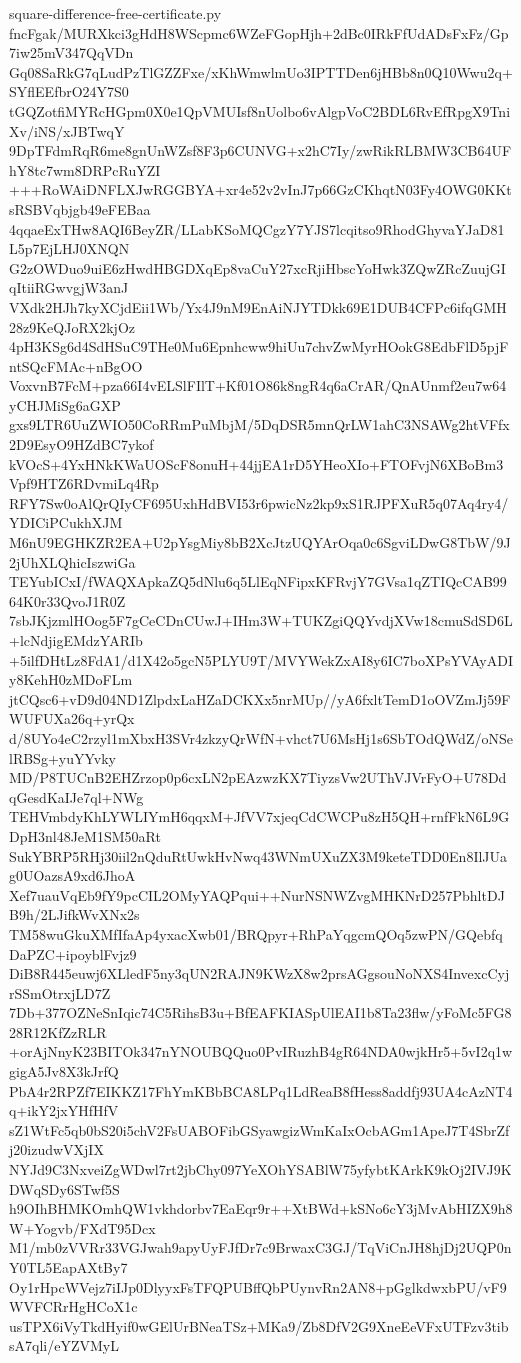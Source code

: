 \documentclass[11pt]{article}
\theoremstyle{definition}
\theoremstyle{remark}
\begin{document}
\begin{filecontents*}[overwrite]{square-difference-free-certificate.py}
fncFgak/MURXkci3gHdH8WScpmc6WZeFGopHjh+2dBc0IRkFfUdADsFxFz/Gp7iw25mV347QqVDn
Gq08SaRkG7qLudPzTlGZZFxe/xKhWmwlmUo3IPTTDen6jHBb8n0Q10Wwu2q+SYflEEfbrO24Y7S0
tGQZotfiMYRcHGpm0X0e1QpVMUIsf8nUolbo6vAlgpVoC2BDL6RvEfRpgX9TniXv/iNS/xJBTwqY
9DpTFdmRqR6me8gnUnWZsf8F3p6CUNVG+x2hC7Iy/zwRikRLBMW3CB64UFhY8tc7wm8DRPcRuYZI
+++RoWAiDNFLXJwRGGBYA+xr4e52v2vInJ7p66GzCKhqtN03Fy4OWG0KKtsRSBVqbjgb49eFEBaa
4qqaeExTHw8AQI6BeyZR/LLabKSoMQCgzY7YJS7lcqitso9RhodGhyvaYJaD81L5p7EjLHJ0XNQN
G2zOWDuo9uiE6zHwdHBGDXqEp8vaCuY27xcRjiHbscYoHwk3ZQwZRcZuujGIqItiiRGwvgjW3anJ
VXdk2HJh7kyXCjdEii1Wb/Yx4J9nM9EnAiNJYTDkk69E1DUB4CFPc6ifqGMH28z9KeQJoRX2kjOz
4pH3KSg6d4SdHSuC9THe0Mu6Epnhcww9hiUu7chvZwMyrHOokG8EdbFlD5pjFntSQcFMAc+nBgOO
VoxvnB7FcM+pza66I4vELSlFIlT+Kf01O86k8ngR4q6aCrAR/QnAUnmf2eu7w64yCHJMiSg6aGXP
gxs9LTR6UuZWIO50CoRRmPuMbjM/5DqDSR5mnQrLW1ahC3NSAWg2htVFfx2D9EsyO9HZdBC7ykof
kVOcS+4YxHNkKWaUOScF8onuH+44jjEA1rD5YHeoXIo+FTOFvjN6XBoBm3Vpf9HTZ6RDvmiLq4Rp
RFY7Sw0oAlQrQIyCF695UxhHdBVI53r6pwicNz2kp9xS1RJPFXuR5q07Aq4ry4/YDICiPCukhXJM
M6nU9EGHKZR2EA+U2pYsgMiy8bB2XcJtzUQYArOqa0c6SgviLDwG8TbW/9J2jUhXLQhicIszwiGa
TEYubICxI/fWAQXApkaZQ5dNlu6q5LlEqNFipxKFRvjY7GVsa1qZTIQcCAB9964K0r33QvoJ1R0Z
7sbJKjzmlHOog5F7gCeCDnCUwJ+IHm3W+TUKZgiQQYvdjXVw18cmuSdSD6L+lcNdjigEMdzYARIb
+5ilfDHtLz8FdA1/d1X42o5gcN5PLYU9T/MVYWekZxAI8y6IC7boXPsYVAyADIy8KehH0zMDoFLm
jtCQsc6+vD9d04ND1ZlpdxLaHZaDCKXx5nrMUp//yA6fxltTemD1oOVZmJj59FWUFUXa26q+yrQx
d/8UYo4eC2rzyl1mXbxH3SVr4zkzyQrWfN+vhct7U6MsHj1s6SbTOdQWdZ/oNSelRBSg+yuYYvky
MD/P8TUCnB2EHZrzop0p6cxLN2pEAzwzKX7TiyzsVw2UThVJVrFyO+U78DdqGesdKaIJe7ql+NWg
TEHVmbdyKhLYWLIYmH6qqxM+JfVV7xjeqCdCWCPu8zH5QH+rnfFkN6L9GDpH3nl48JeM1SM50aRt
SukYBRP5RHj30iil2nQduRtUwkHvNwq43WNmUXuZX3M9keteTDD0En8IlJUag0UOazsA9xd6JhoA
Xef7uauVqEb9fY9pcCIL2OMyYAQPqui++NurNSNWZvgMHKNrD257PbhltDJB9h/2LJifkWvXNx2s
TM58wuGkuXMfIfaAp4yxacXwb01/BRQpyr+RhPaYqgcmQOq5zwPN/GQebfqDaPZC+ipoyblFvjz9
DiB8R445euwj6XLledF5ny3qUN2RAJN9KWzX8w2prsAGgsouNoNXS4InvexcCyjrSSmOtrxjLD7Z
7Db+377OZNeSnIqic74C5RihsB3u+BfEAFKIASpUlEAI1b8Ta23flw/yFoMc5FG828R12KfZzRLR
+orAjNnyK23BITOk347nYNOUBQQuo0PvIRuzhB4gR64NDA0wjkHr5+5vI2q1wgigA5Jv8X3kJrfQ
PbA4r2RPZf7EIKKZ17FhYmKBbBCA8LPq1LdReaB8fHess8addfj93UA4cAzNT4q+ikY2jxYHfHfV
sZ1WtFc5qb0bS20i5chV2FsUABOFibGSyawgizWmKaIxOcbAGm1ApeJ7T4SbrZfj20izudwVXjIX
NYJd9C3NxveiZgWDwl7rt2jbChy097YeXOhYSABlW75yfybtKArkK9kOj2IVJ9KDWqSDy6STwf5S
h9OIhBHMKOmhQW1vkhdorbv7EaEqr9r++XtBWd+kSNo6cY3jMvAbHIZX9h8W+Yogvb/FXdT95Dcx
M1/mb0zVVRr33VGJwah9apyUyFJfDr7c9BrwaxC3GJ/TqViCnJH8hjDj2UQP0nY0TL5EapAXtBy7
Oy1rHpcWVejz7iIJp0DlyyxFsTFQPUBffQbPUynvRn2AN8+pGglkdwxbPU/vF9WVFCRrHgHCoX1c
usTPX6iVyTkdHyif0wGElUrBNeaTSz+MKa9/Zb8DfV2G9XneEeVFxUTFzv3tibsA7qli/eYZVMyL

\end{filecontents*}
\end{document}
